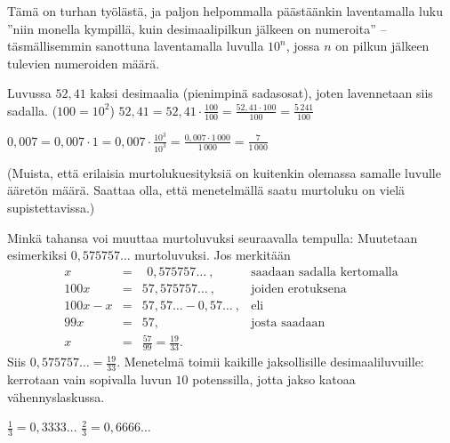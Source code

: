 Tämä on turhan työlästä, ja paljon helpommalla päästäänkin laventamalla luku ''niin monella kympillä, kuin desimaalipilkun jälkeen on numeroita'' -- täsmällisemmin sanottuna laventamalla luvulla $10^n$, jossa $n$ on pilkun jälkeen tulevien numeroiden määrä.

\begin{esimerkki}
Luvussa $52,41$ kaksi desimaalia (pienimpinä sadasosat), joten lavennetaan siis sadalla. ($100=10^2$)
$52,41 = 52,41 \cdot  \frac{100}{100} = \frac{52,41 \cdot 100}{100} = \frac{5\,241}{100}$
\end{esimerkki}

\begin{esimerkki}
$0,007 = 0,007 \cdot 1 = 0,007 \cdot \frac{10^3}{10^3} = \frac{0,007 \cdot 1\,000}{1\,000} = \frac{7}{1\,000}$
\end{esimerkki}

(Muista, että erilaisia murtolukuesityksiä on kuitenkin olemassa samalle luvulle ääretön määrä. Saattaa olla, että menetelmällä saatu murtoluku on vielä supistettavissa.)

Minkä tahansa  voi muuttaa murtoluvuksi seuraavalla tempulla: Muutetaan esimerkiksi $0,575757\ldots$ murtoluvuksi. Jos merkitään
\[
\begin{array}{rcll}
x &=& \ \, 0,575757 \ldots\ , &\textrm{saadaan sadalla kertomalla} \\
100x &=& 57,575757 \ldots \ , &\textrm{joiden erotuksena} \\
100x - x &=& 57,57 \ldots - 0,57 \ldots \ , & \textrm{eli} \\
99x &=& 57, & \textrm{josta saadaan} \\
x &=& \frac{57}{99} = \frac{19}{33}.
\end{array}
\]
Siis $0,575757\ldots = \frac{19}{33}$. Menetelmä toimii kaikille jaksollisille desimaaliluvuille: kerrotaan vain sopivalla luvun $10$ potenssilla, jotta jakso katoaa vähennyslaskussa.

$\frac{1}{3} = 0,3333\ldots$
$\frac{2}{3} = 0,6666\ldots$ %

